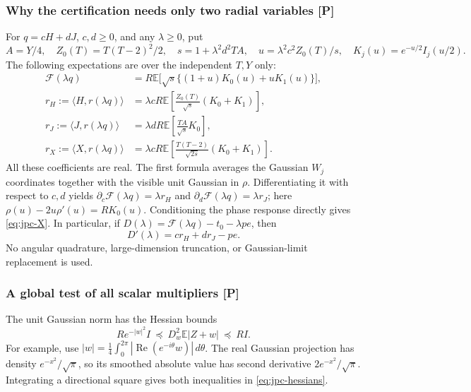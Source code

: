 \subsubsection{Why the certification needs only two radial variables [P]}
For $q=cH+dJ$, $c,d\ge0$, and any $\lambda\ge0$, put
\[
 A=Y/4,\quad Z_0(T)=T(T-2)^2/2,\quad
 s=1+\lambda^2d^2TA,\quad u=\lambda^2c^2Z_0(T)/s,
 \quad K_j(u)=e^{-u/2}I_j(u/2).
\]
The following expectations are over the independent $T,Y$ only:
\begin{align}
 \mathcal F(\lambda q)
 &=R\mathbb E\big[\sqrt s\{(1+u)K_0(u)+uK_1(u)\}\big],\label{eq:jpc-A}\\
 r_H:=\langle H,r(\lambda q)\rangle
 &=\lambda cR\mathbb E\left[\frac{Z_0(T)}{\sqrt s}(K_0+K_1)\right],\label{eq:jpc-H}\\
 r_J:=\langle J,r(\lambda q)\rangle
 &=\lambda dR\mathbb E\left[\frac{TA}{\sqrt s}K_0\right],\label{eq:jpc-J}\\
 r_X:=\langle X,r(\lambda q)\rangle
 &=\lambda cR\mathbb E\left[\frac{T(T-2)}{\sqrt{2s}}(K_0+K_1)\right].\label{eq:jpc-X}
\end{align}
All these coefficients are real. The first formula averages the Gaussian
$W_j$ coordinates together with the visible unit Gaussian in $\rho$.
Differentiating it with respect to $c,d$ yields
$\partial_c\mathcal F(\lambda q)=\lambda r_H$ and
$\partial_d\mathcal F(\lambda q)=\lambda r_J$; here
$\rho(u)-2u\rho'(u)=RK_0(u)$.
Conditioning the phase response directly gives \eqref{eq:jpc-X}.
In particular, if
$D(\lambda)=\mathcal F(\lambda q)-t_0-\lambda pe$, then
\begin{equation}\label{eq:jpc-derivative}
 D'(\lambda)=cr_H+dr_J-pe.
\end{equation}
No angular quadrature, large-dimension truncation, or Gaussian-limit
replacement is used.

\subsubsection{A global test of all scalar multipliers [P]}
The unit Gaussian norm has the Hessian bounds
\begin{equation}\label{eq:jpc-hessians}
 R e^{-|w|^2}I\ \preceq\ D^2_w\mathbb E|Z+w|\ \preceq\ RI.
\end{equation}
For example, use
$|w|=\frac14\int_0^{2\pi}|\operatorname{Re}(e^{-i\theta}w)|\,d\theta$.
The real Gaussian projection has density $e^{-x^2}/\sqrt\pi$, so its
smoothed absolute value has second derivative $2e^{-x^2}/\sqrt\pi$.
Integrating a directional square gives both inequalities in
\eqref{eq:jpc-hessians}.

